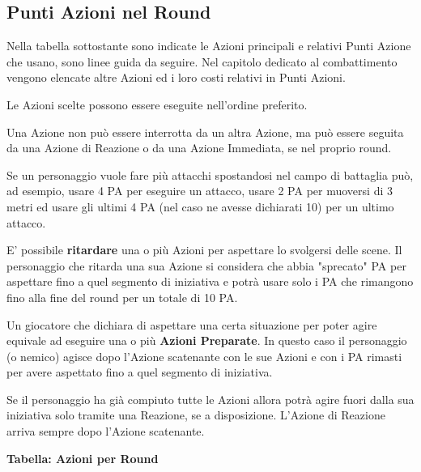 \documentclass[12pt,a4paper,twoside,openany]{book}
\begin{document}
\begin{multicols}{2}
\subsection{Punti Azioni nel Round}\label{azioninelround}

Nella tabella sottostante sono indicate le Azioni principali e relativi Punti Azione che usano, sono linee guida da seguire. Nel capitolo dedicato al combattimento vengono elencate altre Azioni ed i loro costi relativi in Punti Azioni.

Le Azioni scelte possono essere eseguite nell'ordine preferito.

Una Azione non può essere interrotta da un altra Azione, ma può essere seguita da una Azione di Reazione o da una Azione Immediata, se nel proprio round.

Se un personaggio vuole fare più attacchi spostandosi nel campo di battaglia può, ad esempio, usare 4 PA per eseguire un attacco, usare 2 PA per muoversi di 3 metri ed usare gli ultimi 4 PA (nel caso ne avesse dichiarati 10) per un ultimo attacco.

E' possibile \textbf{ritardare} una o più Azioni per aspettare lo svolgersi delle scene. Il personaggio che ritarda una sua Azione si considera che abbia "sprecato" PA per aspettare fino a quel segmento di iniziativa e potrà usare solo i PA che rimangono fino alla fine del round per un totale di 10 PA.

Un giocatore che dichiara di aspettare una certa situazione per poter agire equivale ad eseguire una o più \textbf{Azioni Preparate}. In questo caso il personaggio (o nemico) agisce dopo l'Azione scatenante con le sue Azioni e con i PA rimasti per avere aspettato fino a quel segmento di iniziativa.

Se il personaggio ha già compiuto tutte le Azioni allora potrà agire fuori dalla sua iniziativa solo tramite una Reazione, se a disposizione. L'Azione di Reazione arriva sempre dopo l'Azione scatenante.

\bigskip

\end{multicols}

\textbf{Tabella: Azioni per Round}
\end{document}
